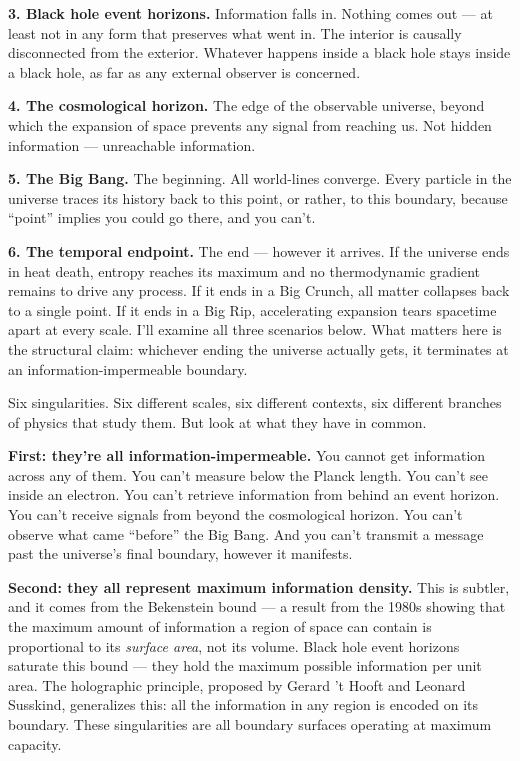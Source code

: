 \documentclass[11pt, twoside, openright]{book}
\begin{document}
\textbf{3. Black hole event horizons.} Information falls in. Nothing comes out --- at least not in any form that preserves what went in. The interior is causally disconnected from the exterior. Whatever happens inside a black hole stays inside a black hole, as far as any external observer is concerned.

\textbf{4. The cosmological horizon.} The edge of the observable universe, beyond which the expansion of space prevents any signal from reaching us. Not hidden information --- unreachable information.

\textbf{5. The Big Bang.} The beginning. All world-lines converge. Every particle in the universe traces its history back to this point, or rather, to this boundary, because ``point'' implies you could go there, and you can't.

\textbf{6. The temporal endpoint.} The end --- however it arrives. If the universe ends in heat death, entropy reaches its maximum and no thermodynamic gradient remains to drive any process. If it ends in a Big Crunch, all matter collapses back to a single point. If it ends in a Big Rip, accelerating expansion tears spacetime apart at every scale. I'll examine all three scenarios below. What matters here is the structural claim: whichever ending the universe actually gets, it terminates at an information-impermeable boundary.

Six singularities. Six different scales, six different contexts, six different branches of physics that study them. But look at what they have in common.

\textbf{First: they're all information-impermeable.} You cannot get information across any of them. You can't measure below the Planck length. You can't see inside an electron. You can't retrieve information from behind an event horizon. You can't receive signals from beyond the cosmological horizon. You can't observe what came ``before'' the Big Bang. And you can't transmit a message past the universe's final boundary, however it manifests.

\textbf{Second: they all represent maximum information density.} This is subtler, and it comes from the Bekenstein bound --- a result from the 1980s showing that the maximum amount of information a region of space can contain is proportional to its \textit{surface area}, not its volume. Black hole event horizons saturate this bound --- they hold the maximum possible information per unit area. The holographic principle, proposed by Gerard 't Hooft and Leonard Susskind, generalizes this: all the information in any region is encoded on its boundary. These singularities are all boundary surfaces operating at maximum capacity.
\end{document}
